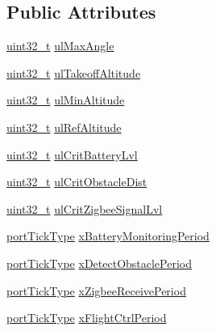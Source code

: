 \subsection*{Public Attributes}
\begin{DoxyCompactItemize}
\item 
\hyperlink{typdefUart_8h_a435d1572bf3f880d55459d9805097f62}{uint32\-\_\-t} \hyperlink{structdroneConfig_a0f6ba8c7c50c247ef54fa48e0f7ef729}{ul\-Max\-Angle}
\item 
\hyperlink{typdefUart_8h_a435d1572bf3f880d55459d9805097f62}{uint32\-\_\-t} \hyperlink{structdroneConfig_a732c5a9d1af9eec7412c8a282109728a}{ul\-Takeoff\-Altitude}
\item 
\hyperlink{typdefUart_8h_a435d1572bf3f880d55459d9805097f62}{uint32\-\_\-t} \hyperlink{structdroneConfig_a93de26859c52f79b9801cf74e1e37add}{ul\-Min\-Altitude}
\item 
\hyperlink{typdefUart_8h_a435d1572bf3f880d55459d9805097f62}{uint32\-\_\-t} \hyperlink{structdroneConfig_a7d7f05ea8f93c206ce1a8a2fa868c587}{ul\-Ref\-Altitude}
\item 
\hyperlink{typdefUart_8h_a435d1572bf3f880d55459d9805097f62}{uint32\-\_\-t} \hyperlink{structdroneConfig_a4ec612c83c80eba7815c541307c9f619}{ul\-Crit\-Battery\-Lvl}
\item 
\hyperlink{typdefUart_8h_a435d1572bf3f880d55459d9805097f62}{uint32\-\_\-t} \hyperlink{structdroneConfig_a39b4ebfe2fad46f568b7a2953fc8f46d}{ul\-Crit\-Obstacle\-Dist}
\item 
\hyperlink{typdefUart_8h_a435d1572bf3f880d55459d9805097f62}{uint32\-\_\-t} \hyperlink{structdroneConfig_ace08c1c7161f782950192970d7a19d75}{ul\-Crit\-Zigbee\-Signal\-Lvl}
\item 
\hyperlink{typdefUart_8h_ae9fa5e001303f1be1c0294f26cde8caf}{port\-Tick\-Type} \hyperlink{structdroneConfig_afa883d29d2c43da22c11352af00ffb7b}{x\-Battery\-Monitoring\-Period}
\item 
\hyperlink{typdefUart_8h_ae9fa5e001303f1be1c0294f26cde8caf}{port\-Tick\-Type} \hyperlink{structdroneConfig_ac536a237bbb15769d731ec98495d7d97}{x\-Detect\-Obstacle\-Period}
\item 
\hyperlink{typdefUart_8h_ae9fa5e001303f1be1c0294f26cde8caf}{port\-Tick\-Type} \hyperlink{structdroneConfig_a8f16de66ac71b922d151ea165b9f4871}{x\-Zigbee\-Receive\-Period}
\item 
\hyperlink{typdefUart_8h_ae9fa5e001303f1be1c0294f26cde8caf}{port\-Tick\-Type} \hyperlink{structdroneConfig_a92f8e6403d9ca068830a44280239e551}{x\-Flight\-Ctrl\-Period}
\item 

\end{DoxyCompactItemize}
